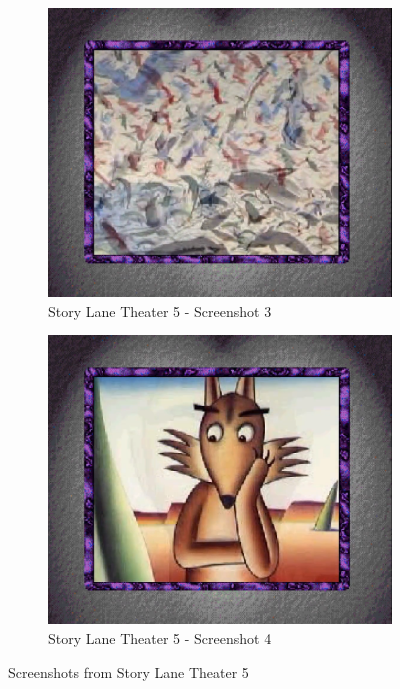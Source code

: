 \begin{figure}[H]
    \begin{subfigure}{0.45\textwidth}
        \centering
        \includegraphics[width=\linewidth]{Games/StoryLaneTheater/Images/StoryLaneTheater5Image3.png}
        \caption{Story Lane Theater 5 - Screenshot 3}
    \end{subfigure}
    \begin{subfigure}{0.45\textwidth}
        \centering
        \includegraphics[width=\linewidth]{Games/StoryLaneTheater/Images/StoryLaneTheater5Image4.png}
        \caption{Story Lane Theater 5 - Screenshot 4}
    \end{subfigure}
    \caption{Screenshots from Story Lane Theater 5}
\end{figure}